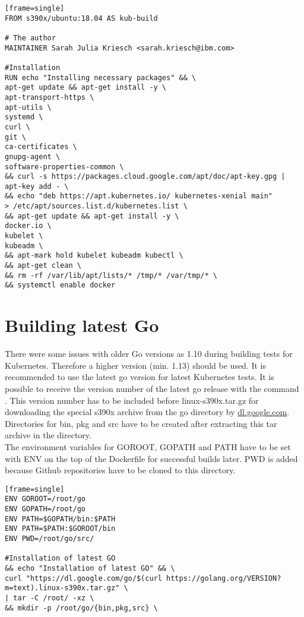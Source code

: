 \begin{verbatim}[frame=single]
FROM s390x/ubuntu:18.04 AS kub-build
 
# The author
MAINTAINER Sarah Julia Kriesch <sarah.kriesch@ibm.com>

#Installation
RUN echo "Installing necessary packages" && \
apt-get update && apt-get install -y \
apt-transport-https \
apt-utils \
systemd \
curl \
git \
ca-certificates \
gnupg-agent \
software-properties-common \
&& curl -s https://packages.cloud.google.com/apt/doc/apt-key.gpg | apt-key add - \
&& echo "deb https://apt.kubernetes.io/ kubernetes-xenial main" 
> /etc/apt/sources.list.d/kubernetes.list \
&& apt-get update && apt-get install -y \
docker.io \
kubelet \
kubeadm \
&& apt-mark hold kubelet kubeadm kubectl \
&& apt-get clean \
&& rm -rf /var/lib/apt/lists/* /tmp/* /var/tmp/* \
&& systemctl enable docker 
\end{verbatim}

\section{Building latest Go}

There were some issues with older Go versions as 1.10 during building tests for Kubernetes. Therefore a higher version (min. 1.13) should be used. It is recommended to use the latest go version for latest Kubernetes tests. It is possible to receive the version number of the latest go release with the command . This version number has to be included before linux-s390x.tar.gz for downloading the special s390x archive from the go directory by \url{dl.google.com}. Directories for bin, pkg and src have to be created after extracting this tar archive in the  directory. \\

The environment variables for GOROOT, GOPATH and PATH have to be set with ENV on the top of the Dockerfile for successful builds later. PWD is added because Github repositories have to be cloned to this directory.

\begin{verbatim}[frame=single]
ENV GOROOT=/root/go
ENV GOPATH=/root/go
ENV PATH=$GOPATH/bin:$PATH
ENV PATH=$PATH:$GOROOT/bin
ENV PWD=/root/go/src/

#Installation of latest GO
&& echo "Installation of latest GO" && \
curl "https://dl.google.com/go/$(curl https://golang.org/VERSION?m=text).linux-s390x.tar.gz" \
| tar -C /root/ -xz \
&& mkdir -p /root/go/{bin,pkg,src} \
\end{verbatim}

